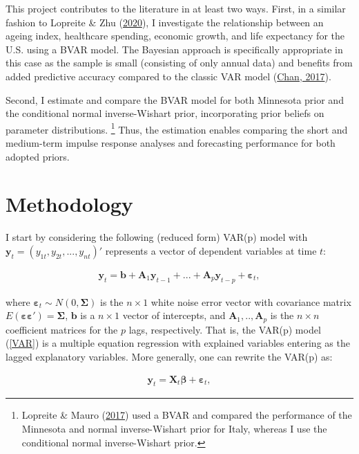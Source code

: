 \documentclass[11pt,preprint, authoryear]{elsarticle}
\numberwithin{equation}{section}
\numberwithin{figure}{section}
\numberwithin{table}{section}
\let\rmarkdownfootnote\footnote%
\def\footnote{\protect\rmarkdownfootnote}
\begin{document}
This project contributes to the literature in at least two ways. First,
in a similar fashion to Lopreite \& Zhu
(\protect\hyperlink{ref-lopreite2020}{2020}), I investigate the
relationship between an ageing index, healthcare spending, economic
growth, and life expectancy for the U.S. using a BVAR model. The
Bayesian approach is specifically appropriate in this case as the sample
is small (consisting of only annual data) and benefits from added
predictive accuracy compared to the classic VAR model
(\protect\hyperlink{ref-chan2017notes}{Chan, 2017}).

Second, I estimate and compare the BVAR model for both Minnesota prior
and the conditional normal inverse-Wishart prior, incorporating prior
beliefs on parameter distributions. \footnote{Lopreite \& Mauro
  (\protect\hyperlink{ref-lopreite2017}{2017}) used a BVAR and compared
  the performance of the Minnesota and normal inverse-Wishart prior for
  Italy, whereas I use the conditional normal inverse-Wishart prior.}
Thus, the estimation enables comparing the short and medium-term impulse
response analyses and forecasting performance for both adopted priors.

\hypertarget{methodology}{%
\section{\texorpdfstring{Methodology
\label{meth}}{Methodology }}\label{methodology}}

I start by considering the following (reduced form) VAR(p) model with
\(\bm{y}_t = (y_{1t}, y_{2t}, ... , y_{nt})'\) represents a vector of
dependent variables at time \(t\):

\begin{align}
\mathbf{y}_t = \bm{b} + \bm{A}_1 \bm{y}_{t-1} + ... + \bm{A}_p \bm{y}_{t-p} + \bm{\varepsilon}_t, \label{VAR} 
\end{align}

where \(\bm{\varepsilon}_t \sim N(0, \bm{\Sigma})\) is the
\(n \times 1\) white noise error vector with covariance matrix
\(E(\bm{\varepsilon \varepsilon}')= \bm{\Sigma}\), \(\bm{b}\) is a
\(n \times 1\) vector of intercepts, and \(\bm{A}_1,.., \bm{A}_p\) is
the \(n \times n\) coefficient matrices for the \(p\) lags,
respectively. That is, the VAR(p) model (\ref{VAR}) is a multiple
equation regression with explained variables entering as the lagged
explanatory variables. More generally, one can rewrite the VAR(p) as:

\begin{align}
\bm{y}_t = \bm{X}_t \bm{\beta}  + \bm{\varepsilon}_t, \label{VAR1}
\end{align}
\end{document}
